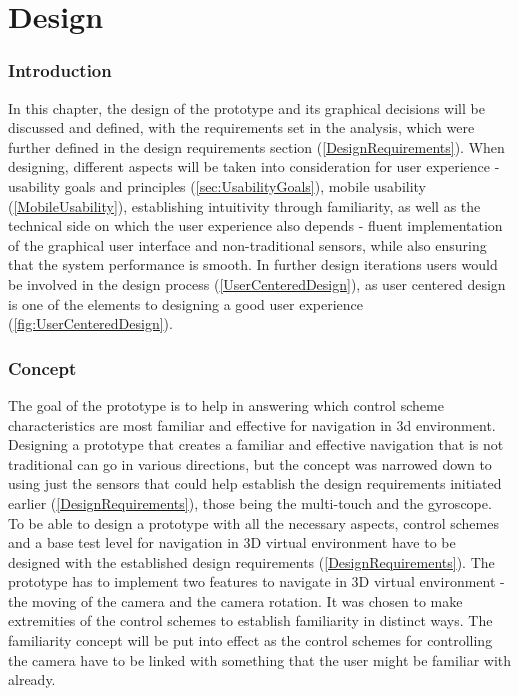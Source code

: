 \chapter{Design}
\subsection{Introduction}
In this chapter, the design of the prototype and its graphical decisions will be discussed and defined, with the requirements set in the analysis, which were further defined in the design requirements section (\ref{DesignRequirements}). When designing, different aspects will be taken into consideration for user experience - usability goals and principles (\ref{sec:UsabilityGoals}), mobile usability (\ref{MobileUsability}), establishing intuitivity through familiarity, as well as the technical side on which the user experience also depends - fluent implementation of the graphical user interface and non-traditional sensors, while also ensuring that the system performance is smooth. In further design iterations users would be involved in the design process (\ref{UserCenteredDesign}), as user centered design is one of the elements to designing a good user experience (\ref{fig:UserCenteredDesign}).

\subsection{Concept}
The goal of the prototype is to help in answering which control scheme characteristics are most familiar and effective for navigation in 3d environment. Designing a prototype that creates a familiar and effective navigation that is not traditional can go in various directions, but the concept was narrowed down to using just the sensors that could help establish the design requirements initiated earlier (\ref{DesignRequirements}), those being the multi-touch and the gyroscope.
To be able to design a prototype with all the necessary aspects, control schemes and a base test level for navigation in 3D virtual environment have to be designed with the established design requirements (\ref{DesignRequirements}).
The prototype has to implement two features to navigate in 3D virtual environment - the moving of the camera and the camera rotation. It was chosen to make extremities of the control schemes to establish familiarity in distinct ways. The familiarity concept will be put into effect as the control schemes for controlling the camera have to be linked with something that the user might be familiar with already. 

